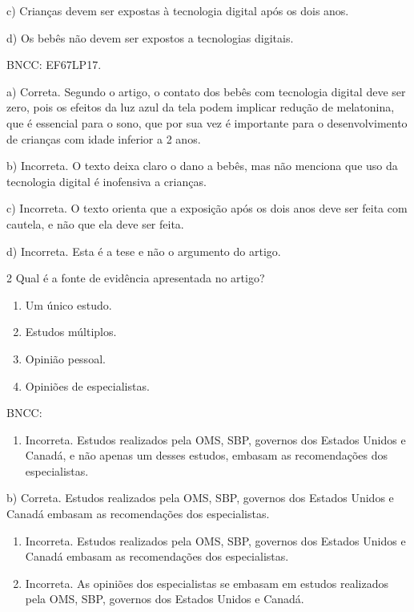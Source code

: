 c) Crianças devem ser expostas à tecnologia digital após os dois anos.

d) Os bebês não devem ser expostos a tecnologias digitais.

BNCC: EF67LP17.

a) Correta. Segundo o artigo, o contato dos bebês com tecnologia digital
deve ser zero, pois os efeitos da luz azul da tela podem implicar
redução de melatonina, que é essencial para o sono, que por sua vez é
importante para o desenvolvimento de crianças com idade inferior a 2
anos.

b) Incorreta. O texto deixa claro o dano a bebês, mas não menciona que
uso da tecnologia digital é inofensiva a crianças.

c) Incorreta. O texto orienta que a exposição após os dois anos deve ser
feita com cautela, e não que ela deve ser feita.

d) Incorreta. Esta é a tese e não o argumento do artigo.

\num{2} Qual é a fonte de evidência apresentada no artigo?

\begin{enumerate}
\def\labelenumi{\alph{enumi})}
\item
  Um único estudo.
\item
  Estudos múltiplos.
\item
  Opinião pessoal.
\item
  Opiniões de especialistas.
\end{enumerate}

BNCC:

\begin{enumerate}
\def\labelenumi{\alph{enumi})}
\tightlist
\item
  Incorreta. Estudos realizados pela OMS, SBP, governos dos Estados
  Unidos e Canadá, e não apenas um desses estudos, embasam as
  recomendações dos especialistas.
\end{enumerate}

b) Correta. Estudos realizados pela OMS, SBP, governos dos Estados
Unidos e Canadá embasam as recomendações dos especialistas.

\begin{enumerate}
\def\labelenumi{\alph{enumi})}
\setcounter{enumi}{2}
\item
  Incorreta. Estudos realizados pela OMS, SBP, governos dos Estados
  Unidos e Canadá embasam as recomendações dos especialistas.
\item
  Incorreta. As opiniões dos especialistas se embasam em estudos
  realizados pela OMS, SBP, governos dos Estados Unidos e Canadá.
\end{enumerate}

